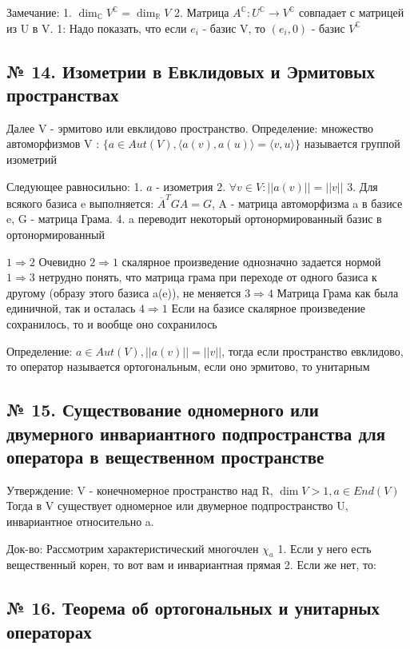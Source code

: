 \documentclass{article}
\begin{document}
Замечание:
1. $\dim_{\mathbb{C}}{V^{\mathbb{C}}} = \dim_{\mathbb{R}}{V}$
2. Матрица $A^{\mathbb{C}} : U^{\mathbb{C}} \rightarrow V^{\mathbb{C}}$ совпадает с матрицей из U в V.
1: Надо показать, что если $e_i$ - базис V, то $(e_i, 0)$ - базис $V^{\mathbb{C}}$

\subsection{\tiny № 14. Изометрии в Евклидовых и Эрмитовых пространствах}

Далее V - эрмитово или евклидово пространство.
Определение: множество автоморфизмов V : $\{a \in Aut(V), \langle a(v), a(u) \rangle = \langle v, u \rangle \}$ называется группой изометрий

Следующее равносильно:
1. $a$ - изометрия
2. $\forall v \in V: ||a(v)|| = ||v||$
3. Для всякого базиса e выполняется: $\overline{A}^TGA = G$, A - матрица автоморфизма a в базисе e, G - матрица Грама.
4. a переводит некоторый ортонормированный базис в ортонормированный

$1 \Rightarrow 2$ Очевидно
$2 \Rightarrow 1$ скалярное произведение однозначно задается нормой
$1 \Rightarrow 3$ нетрудно понять, что матрица грама при переходе от одного базиса к другому (образу этого базиса a(e)), не меняется
$3 \Rightarrow 4$ Матрица Грама как была единичной, так и осталась
$4 \Rightarrow 1$ Если на базисе скалярное произведение сохранилось, то и вообще оно сохранилось

Определение:
$a \in Aut(V), ||a(v)|| = ||v||$, тогда если пространство евклидово, то оператор называется ортогональным, если оно эрмитово, то унитарным


\subsection{\tiny № 15. Существование одномерного или двумерного инвариантного подпространства для оператора в вещественном пространстве}

Утверждение: V - конечномерное пространство над R, $\dim{V} > 1, a \in End(V)$
Тогда в V существует одномерное или двумерное подпространство U, инвариантное относительно a.

Док-во:
Рассмотрим характеристический многочлен $\chi_a$
1. Если у него есть вещественный корен, то вот вам и инвариантная прямая
2. Если же нет, то: 

\subsection{\tiny № 16. Теорема об ортогональных и унитарных операторах}
\end{document}
